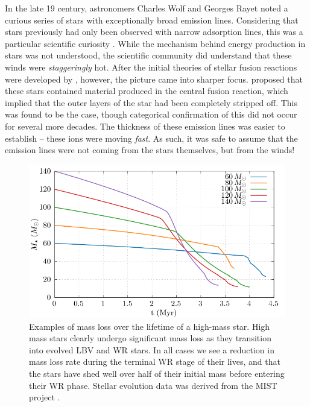 
\noindent
In the late 19 century, astronomers Charles Wolf and Georges Rayet noted a curious series of stars with exceptionally broad emission lines.
Considering that stars previously had only been observed with narrow adsorption lines, this was a particular scientific curiosity
\parencite{crowther_physical_2007}.
While the mechanism behind energy production in stars was not understood, the scientific community did understand that these winds were \emph{staggeringly} hot.
After the initial theories of stellar fusion reactions were developed by \textcite{betheEnergyProductionStars1939}, however, the picture came into sharper focus.
\textcite{gamowWCWNStars1943} proposed that these stars contained material produced in the central fusion reaction, which implied that the outer layers of the star had been completely stripped off.
This was found to be the case, though categorical confirmation of this did not occur for several more decades.
The thickness of these emission lines was easier to establish -- these ions were moving \emph{fast}.
As such, it was safe to assume that the emission lines were not coming from the stars themselves, but from the winds!


\begin{figure}[ht]
  \centering
  \includegraphics{assets/massloss/massloss.pdf}
  \caption[Examples of mass loss over the lifetime of a high-mass star]{Examples of mass loss over the lifetime of a high-mass star. High mass stars clearly undergo significant mass loss as they transition into evolved LBV and WR stars. In all cases we see a reduction in mass loss rate during the terminal WR stage of their lives, and that the stars have shed well over half of their initial mass before entering their WR phase. Stellar evolution data was derived from the MIST project \parencite{choiMesaIsochronesStellar2016,dotterMESAIsochronesStellar2016,paxtonModulesExperimentsStellar2011}.}
  \label{fig:mist-massloss}
\end{figure}

